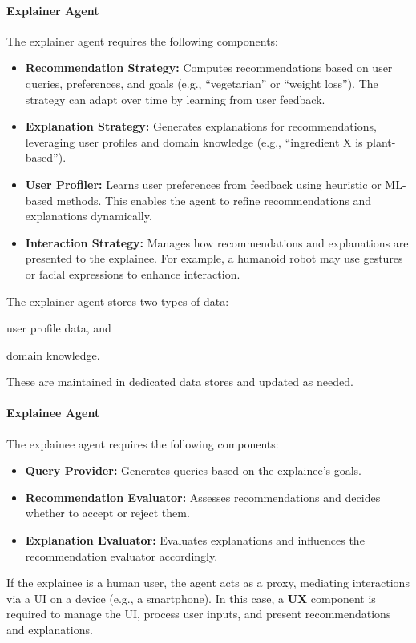 \paragraph{Explainer Agent}
%
The explainer agent requires the following components:
%
\begin{itemize}
    \item \textbf{Recommendation Strategy:} Computes recommendations based on user queries, preferences, and goals (e.g., ``vegetarian'' or ``weight loss'').
    The strategy can adapt over time by learning from user feedback.
    \item \textbf{Explanation Strategy:} Generates explanations for recommendations, leveraging user profiles and domain knowledge (e.g., ``ingredient X is plant-based'').
    \item \textbf{User Profiler:} Learns user preferences from feedback using heuristic or \gls{ML}-based methods.
    This enables the agent to refine recommendations and explanations dynamically.
    \item \textbf{Interaction Strategy:} Manages how recommendations and explanations are presented to the explainee.
    For example, a humanoid robot may use gestures or facial expressions to enhance interaction.
\end{itemize}
%
The explainer agent stores two types of data:
%
\begin{inlinelist}
    \item user profile data, and
    \item domain knowledge.
\end{inlinelist}
%
These are maintained in dedicated data stores and updated as needed.

\paragraph{Explainee Agent}
%
The explainee agent requires the following components:
%
\begin{itemize}
    \item \textbf{Query Provider:} Generates queries based on the explainee's goals.
    \item \textbf{Recommendation Evaluator:} Assesses recommendations and decides whether to accept or reject them.
    \item \textbf{Explanation Evaluator:} Evaluates explanations and influences the recommendation evaluator accordingly.
\end{itemize}
%
If the explainee is a human user, the agent acts as a proxy, mediating interactions via a \gls{UI} on a device (e.g., a smartphone).
%
In this case, a \textbf{\gls{UX}} component is required to manage the \gls{UI}, process user inputs, and present recommendations and explanations.


